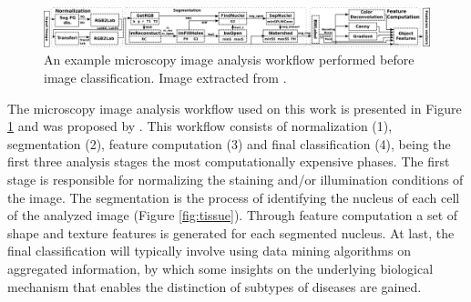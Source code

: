 \begin{figure}[b]
\begin{center}
\includegraphics[width=1\textwidth]{img/nucleiPipelineCur.png}
\caption{An example microscopy image analysis workflow performed before image classification. Image extracted from \cite{barreiros_parallel_2017}.}
\label{fig:wf}
\end{center}
\end{figure}

The microscopy image analysis workflow used on this work is presented in Figure \ref{fig:wf} and was proposed by \cite{kong2013machine,DBLP:conf/bibm/KongWTCMKPSB13,Teodoro-IPDPS2013}. This workflow consists of normalization (1), segmentation (2), feature computation (3) and final classification (4), being the first three analysis stages the most computationally expensive phases. The first stage is responsible for normalizing the staining and/or illumination conditions of the image. The segmentation is the process of identifying the nucleus of each cell of the analyzed image (Figure \ref{fig:tissue}). Through feature computation a set of shape and texture features is generated for each segmented nucleus. At last, the final classification will typically involve using data mining algorithms on aggregated information, by which some insights on the underlying biological mechanism that enables the distinction of subtypes of diseases are gained.

